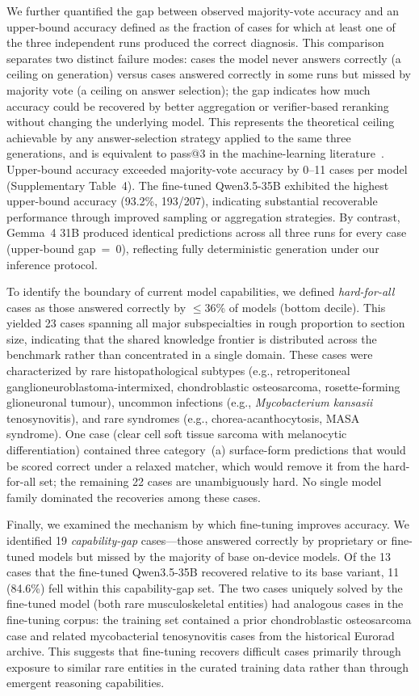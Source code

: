 \documentclass[10pt,journal,compsoc, onecolumn]{IEEEtran}
\begin{document}
We further quantified the gap between observed majority-vote accuracy and an upper-bound accuracy defined as the fraction of cases for which at least one of the three independent runs produced the correct diagnosis. This comparison separates two distinct failure modes: cases the model never answers correctly (a ceiling on generation) versus cases answered correctly in some runs but missed by majority vote (a ceiling on answer selection); the gap indicates how much accuracy could be recovered by better aggregation or verifier-based reranking without changing the underlying model. This represents the theoretical ceiling achievable by any answer-selection strategy applied to the same three generations, and is equivalent to pass@3 in the machine-learning literature~\cite{chen2021codex}. Upper-bound accuracy exceeded majority-vote accuracy by 0--11 cases per model (Supplementary Table~4). The fine-tuned Qwen3.5-35B exhibited the highest upper-bound accuracy (93.2\%, 193/207), indicating substantial recoverable performance through improved sampling or aggregation strategies. By contrast, Gemma~4 31B produced identical predictions across all three runs for every case (upper-bound gap~=~0), reflecting fully deterministic generation under our inference protocol.

To identify the boundary of current model capabilities, we defined \textit{hard-for-all} cases as those answered correctly by $\leq$36\% of models (bottom decile). This yielded 23 cases spanning all major subspecialties in rough proportion to section size, indicating that the shared knowledge frontier is distributed across the benchmark rather than concentrated in a single domain. These cases were characterized by rare histopathological subtypes (e.g., retroperitoneal ganglioneuroblastoma-intermixed, chondroblastic osteosarcoma, rosette-forming glioneuronal tumour), uncommon infections (e.g., \textit{Mycobacterium kansasii} tenosynovitis), and rare syndromes (e.g., chorea-acanthocytosis, MASA syndrome). One case (clear cell soft tissue sarcoma with melanocytic differentiation) contained three category~(a) surface-form predictions that would be scored correct under a relaxed matcher, which would remove it from the hard-for-all set; the remaining 22 cases are unambiguously hard. No single model family dominated the recoveries among these cases.

Finally, we examined the mechanism by which fine-tuning improves accuracy. We identified 19 \textit{capability-gap} cases---those answered correctly by proprietary or fine-tuned models but missed by the majority of base on-device models. Of the 13 cases that the fine-tuned Qwen3.5-35B recovered relative to its base variant, 11 (84.6\%) fell within this capability-gap set. The two cases uniquely solved by the fine-tuned model (both rare musculoskeletal entities) had analogous cases in the fine-tuning corpus: the training set contained a prior chondroblastic osteosarcoma case and related mycobacterial tenosynovitis cases from the historical Eurorad archive. This suggests that fine-tuning recovers difficult cases primarily through exposure to similar rare entities in the curated training data rather than through emergent reasoning capabilities.
\end{document}
